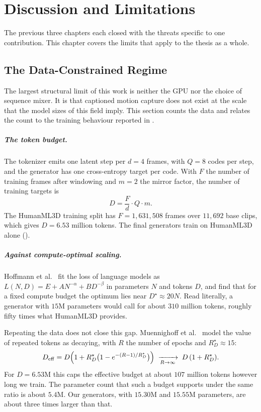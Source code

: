 \chapter{Discussion and Limitations}
\label{chap:discussion}

The previous three chapters each closed with the threats specific to one contribution. This chapter covers the limits that apply to the thesis as a whole.

\section{The Data-Constrained Regime}
\label{sec:disc_data}

The largest structural limit of this work is neither the GPU nor the choice of sequence mixer. It is that captioned motion capture does not exist at the scale that the model sizes of this field imply. This section counts the data and relates the count to the training behaviour reported in .

\paragraph{The token budget.} The tokenizer emits one latent step per $d = 4$ frames, with $Q = 8$ codes per step, and the generator has one cross-entropy target per code. With $F$ the number of training frames after windowing and $m = 2$ the mirror factor, the number of training targets is
\begin{equation}
D = \frac{F}{d} \cdot Q \cdot m .
\end{equation}
The HumanML3D training split has $F = 1{,}631{,}508$ frames over $11{,}692$ base clips, which gives $D = 6.53$ million tokens. The final generators train on HumanML3D alone ().

\paragraph{Against compute-optimal scaling.} Hoffmann et al.~\cite{hoffmann2022chinchilla} fit the loss of language models as $L(N, D) = E + A N^{-\alpha} + B D^{-\beta}$ in parameters $N$ and tokens $D$, and find that for a fixed compute budget the optimum lies near $D^\star \approx 20N$. Read literally, a generator with $15$M parameters would call for about $310$ million tokens, roughly fifty times what HumanML3D provides.

Repeating the data does not close this gap. Muennighoff et al.~\cite{muennighoff2023dataconstrained} model the value of repeated tokens as decaying, with $R$ the number of epochs and $R^\star_D \approx 15$:
\begin{equation}
D_{\mathrm{eff}} = D\Bigl(1 + R^\star_D\bigl(1 - e^{-(R-1)/R^\star_D}\bigr)\Bigr) \;\xrightarrow[R \to \infty]{}\; D\,(1 + R^\star_D).
\end{equation}
For $D = 6.53$M this caps the effective budget at about $107$ million tokens however long we train. The parameter count that such a budget supports under the same ratio is about $5.4$M. Our generators, with $15.30$M and $15.55$M parameters, are about three times larger than that.

